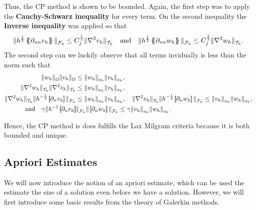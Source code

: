 Thus, the CP method is shown to be bounded.
Again, the first step was to apply the \textbf{Cauchy-Schwarz inequality} for every term. On the second inequality the \textbf{Inverse inequality} was applied so that
\[
\| h^{\frac{1}{2}} \mean{ \partial _{nn}v_{h} }   \|_{ \mathcal{F} _{h}  }^{  }\le   C_{j}^{\frac{1}{2}} \| \nabla ^2 v_{h} \|_{ \mathcal{T} _{h} }^{  } \quad \text{and} \quad   \| h^{\frac{1}{2}} \mean{ \partial _{nn}w_{h} }   \|_{ \mathcal{F} _{h}
}^{  }\le   C_{j}^{\frac{1}{2}} \| \nabla ^2 w_{h} \|_{ \mathcal{T} _{h} }^{  }.
\]
The second step can we luckily observe that all terms invidually is less than the norm such that
\begin{equation}
\label{eq:bounded_ineq}
\begin{split}
\| w_{h} \|_{\Omega    }^{  }  \| v_{h} \|_{ \Omega    }^{  } & \le \| w_{h} \|_{ a_{h} }^{  } \| v_{h} \|_{ a_{h} }^{  }, \\
\| \nabla ^2w_{h} \|_{\mathcal{T}_{h}   }^{  }  \| \nabla ^2v_{h} \|_{\mathcal{T}_{h}   }^{  } & \le \| w_{h} \|_{ a_{h} }^{  } \| v_{h} \|_{ a_{h} }^{  }, \\
\|  \nabla ^2 w_{h} \|_{ \mathcal{T} _{h} }^{ } \| h^{-\frac{1}{2}} \jump{ \partial _{n} v_{h} }   \|_{ \mathcal{F} _{h} }^{  }  & \le  \| w_{h} \|_{ a_{h} }^{  } \| v_{h} \|_{ a_{h} }^{  }, \quad  \|  \nabla
^2 v_{h} \|_{ \mathcal{T} _{h} }^{ } \| h^{-\frac{1}{2}} \jump{ \partial _{n} w_{h} }   \|_{ \mathcal{F} _{h} }^{  }   \le \| v_{h} \|_{ a_{h} }^{  } \| w_{h} \|_{ a_{h} }^{  }, \\
\text{and} \quad    \gamma \| h^{-1 } \jump{ \partial _{n} v_{h} }   & \|_{ \mathcal{F} _{h}  }^{  }  \| \jump{ \partial _{n} w_{h} }    \|_{\mathcal{F}_{h}   }^{  }   \le \gamma \| v_{h} \|_{ a_{h} }^{  }  \| w_{h} \|_{ a_{h} }^{  }.
\end{split}
\end{equation}

Hence, the CP method is does fulfills the Lax Milgram criteria because it is both bounded and unique.


\subsection{Apriori Estimates}%
\label{sub:apriori_estimates}

We will now introduce the notion of an apriori estimate, which can be used the estimate the size of a solution even before we have a solution. However, we will first introduce some basic results from the theory of Galerkin methods.

